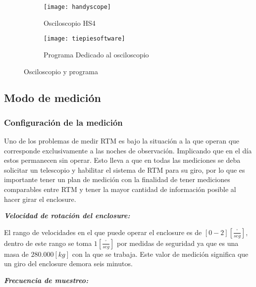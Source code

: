 			\begin{figure}[H]
				\centering
				\begin{subfigure}[b]{0.45\textwidth}
					\texttt{[image: handyscope]}
					\caption{Osciloscopio HS4}
					\label{fig:handyscopehs4}
				\end{subfigure}			    
			    \begin{subfigure}[b]{0.45\textwidth}
			    	\texttt{[image: tiepiesoftware]}
			    	\caption{Programa Dedicado al osciloscopio}
			    	\label{fig:tiepiesoftware}
			    \end{subfigure}
		    \caption{Osciloscopio y programa}
		    \label{fig:osciloscopioyprograma}
		    \end{figure}
	    \subsection{Modo de medición}
	        \subsubsection{Configuración de la medición}
	            Uno de los problemas de medir RTM es bajo la situación a la que operan que corresponde exclusivamente a las noches de observación. Implicando que en el día estos permanecen sin operar. Esto lleva a que en todas las mediciones se deba solicitar un telescopio y habilitar el sistema de RTM para su giro, por lo que es importante tener un plan de medición con la finalidad de tener mediciones comparables entre RTM y tener la mayor cantidad de información posible al hacer girar el enclosure.
	            
	            \vspace{0.5cm}
	            \textit{\textbf{Velocidad de rotación del enclosure:}}
	            \vspace{0.5cm}
	            
	            El rango de velocidades en el que puede operar el enclosure es de $[0-2][\frac{^{\circ}}{seg}]$, dentro de este rango se toma $1 [\frac{^{\circ}}{seg}]$ por medidas de seguridad ya que es una masa de $280.000[kg]$ con la que se trabaja. Este valor de medición significa que un giro del enclosure demora seis minutos.
	            
	            \vspace{0.5cm}
	            \textit{\textbf{Frecuencia de muestreo:}}
	            \vspace{0.5cm}
	            
